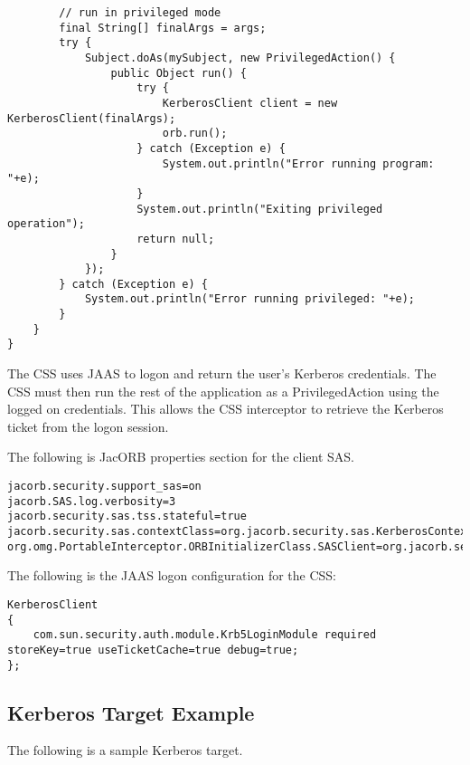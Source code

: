 \begin{scriptsize}
\begin{verbatim}
        // run in privileged mode
        final String[] finalArgs = args;
        try {
            Subject.doAs(mySubject, new PrivilegedAction() {
                public Object run() {
                    try {
                        KerberosClient client = new KerberosClient(finalArgs);
                        orb.run();
                    } catch (Exception e) {
                        System.out.println("Error running program: "+e);
                    }
                    System.out.println("Exiting privileged operation");
                    return null;
                }
            });
        } catch (Exception e) {
            System.out.println("Error running privileged: "+e);
        }
    }
}
\end{verbatim}
\end{scriptsize}

The CSS uses JAAS to logon and return the user's Kerberos credentials.
The CSS must then run the rest of the application as a PrivilegedAction using
the logged on credentials. This allows the CSS interceptor to retrieve the
Kerberos ticket from the logon session.

The following is JacORB properties section for the client SAS.

\begin{scriptsize}
\begin{verbatim}
jacorb.security.support_sas=on
jacorb.SAS.log.verbosity=3
jacorb.security.sas.tss.stateful=true
jacorb.security.sas.contextClass=org.jacorb.security.sas.KerberosContext
org.omg.PortableInterceptor.ORBInitializerClass.SASClient=org.jacorb.security.sas.SASClientInitializer
\end{verbatim}
\end{scriptsize}

The following is the JAAS logon configuration for the CSS:

\begin{scriptsize}
\begin{verbatim}
KerberosClient 
{
    com.sun.security.auth.module.Krb5LoginModule required storeKey=true useTicketCache=true debug=true;
};
\end{verbatim}
\end{scriptsize}


\subsection{Kerberos Target Example}

The following is a sample Kerberos target.

